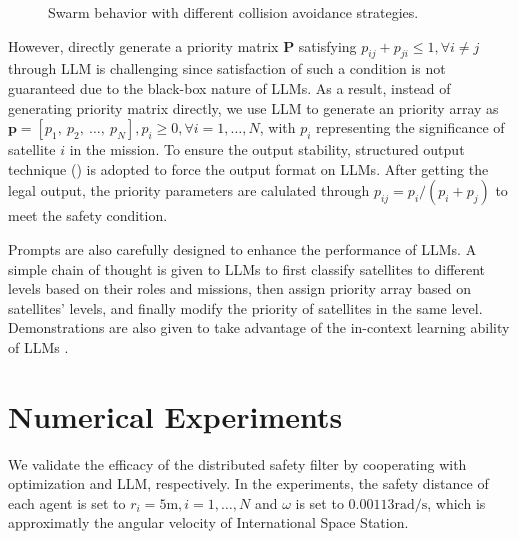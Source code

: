 \documentclass{ifacconf}
\begin{document}
\begin{figure}[t!]
   \caption{Swarm behavior with different collision avoidance strategies.}
   \label{fig:optexp}
\end{figure}

\par However, directly generate a priority matrix $\boldsymbol{P}$ satisfying $p_{ij} + p_{ji} \le 1, \forall i \neq j$ through LLM is challenging since satisfaction of such a condition is not guaranteed due to the black-box nature of LLMs.
As a result, instead of generating priority matrix directly, we use LLM to generate an priority array as $\mathbf{p} = [p_1,~p_2,~\dots,~p_N], p_i \ge 0, \forall i = 1, \dots, N$, with $p_i$ representing the significance of satellite $i$ in the mission.
To ensure the output stability, structured output technique (\cite{XXX}) is adopted to force the output format on LLMs.
After getting the legal output, the priority parameters are calulated through $p_{ij} = p_i/(p_i + p_j)$ to meet the safety condition.

\par Prompts are also carefully designed to enhance the performance of LLMs. A simple chain of thought is given to LLMs to first classify satellites to different levels based on their roles and missions, then assign priority array based on satellites' levels, and finally modify the priority of satellites in the same level.
Demonstrations are also given to take advantage of the in-context learning ability of LLMs \cite[]{Min2022fewshot}.

\section{Numerical Experiments}\label{sec:exp}
\par We validate the efficacy of the distributed safety filter by cooperating with optimization and LLM, respectively. 
In the experiments, the safety distance of each agent is set to $r_i = 5\mathrm{m}, i = 1, \dots, N$ and $\omega$ is set to $0.00113 \mathrm{rad/s}$, which is approximatly the angular velocity of International Space Station.
\end{document}
